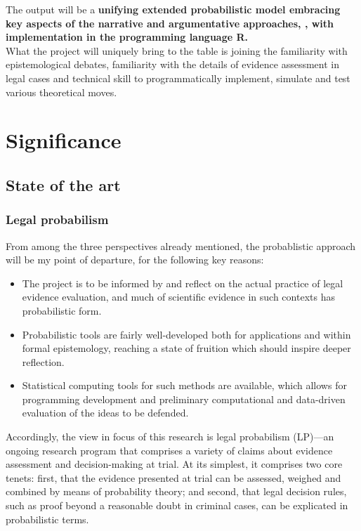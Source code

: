 \documentclass[11pt,dvipsnames,enabledeprecatedfontcommands]{scrartcl}
\begin{document}
The output will be a
\textbf{unifying extended probabilistic model embracing key aspects of the narrative and argumentative approaches, , with  implementation in the programming language \textbf{\textsf{R}}.}\\
What the project will uniquely bring to the table is joining the
familiarity with epistemological debates, familiarity with the details
of evidence assessment in legal cases and technical skill to
programmatically implement, simulate and test various theoretical moves.

\pagebreak 

\section{Significance}\label{significance}

\subsection{State of the art}\label{state-of-the-art}

\subsubsection{Legal probabilism}\label{legal-probabilism}

From among the three perspectives already mentioned, the probablistic
approach will be my point of departure, for the following key reasons:

\begin{itemize}
\item
  The project is to be informed by and reflect on the actual practice of
  legal evidence evaluation, and much of scientific evidence in such
  contexts has probabilistic form.
\item
  Probabilistic tools are fairly well-developed both for applications
  and within formal epistemology, reaching a state of fruition which
  should inspire deeper reflection.
\item
  Statistical computing tools for such methods are available, which
  allows for programming development and preliminary computational and
  data-driven evaluation of the ideas to be defended.
\end{itemize}

Accordingly, the view in focus of this research is legal probabilism
(LP)---an ongoing research program that comprises a variety of claims
about evidence assessment and decision-making at trial. At its simplest,
it comprises two core tenets: first, that the evidence presented at
trial can be assessed, weighed and combined by means of probability
theory; and second, that legal decision rules, such as proof beyond a
reasonable doubt in criminal cases, can be explicated in probabilistic
terms.
\end{document}
